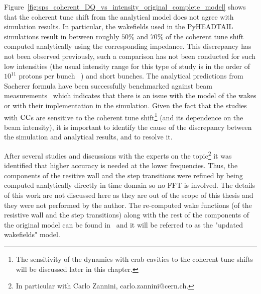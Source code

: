 Figure~\ref{fig:sps_coherent_DQ_vs_intensity_original_complete_model} shows that the coherent tune shift from the analytical model does not agree with simulation results. In particular, the wakefields used in the PyHEADTAIL simulations result in between roughly $50\%$ and $70\%$ of the coherent tune shift computed analytically using the corresponding impedance. This discrepancy has not been observed previously, such a comparison has not been conducted for such low intensities (the usual intensity range for this type of study is in the order of $10^{11}$ protons per bunch ~\cite{Beck:2683038}) and short bunches. %
The analytical predictions from Sacherer formula have been successfully benchmarked against beam measurements~\cite{Bartosik:1742183, sps_impedance_measurements_vs_model} which indicates that there is an issue with the model of the wakes or with their implementation in the simulation. Given the fact that the studies with ${\mathrm{CC}}$s are sensitive to the coherent tune shift\footnote{The sensitivity of the dynamics with crab cavities to the coherent tune shifts will be discussed later in this chapter.} (and its dependence on the beam intensity), it is important to identify the cause of the discrepancy between the simulation and analytical results, and to resolve it.

 After several studies and discussions with the experts on the topic\footnote{In particular with Carlo Zannini, carlo.zannini@cern.ch.} it was identified that higher accuracy is needed at the lower frequencies. Thus, the components of the resitive wall and the step transitions were refined by being computed analytically directly in time domain so no FFT is involved. %
The details of this work are not discussed here as they are out of the scope of this thesis and they were not performed by the author. The re-computed wake functions (of the resistive wall and the step transitions) along with the rest of the components of the original model can be found in~\cite{updated_sps_wakfields_model} and it will be referred to as the "updated wakefields" model.

